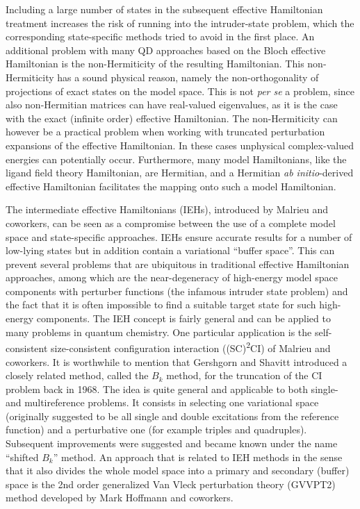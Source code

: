 Including a large number of states in the subsequent effective Hamiltonian treatment increases the risk of running into the intruder-state problem, which the corresponding state-specific methods tried to avoid in the first place. An additional problem with many QD approaches based on the Bloch effective Hamiltonian is the non-Hermiticity of the resulting Hamiltonian. This non-Hermiticity has a sound physical reason, namely the non-orthogonality of projections of exact states on the model space. This is not \textit{per se} a problem, since also non-Hermitian matrices can have real-valued eigenvalues, as it is the case with the exact (infinite order) effective Hamiltonian. The non-Hermiticity can however be a practical problem when working with truncated perturbation expansions of the effective Hamiltonian. In these cases unphysical complex-valued energies can potentially occur. Furthermore, many model Hamiltonians, like the ligand field theory Hamiltonian,\cite{Griff_1971_} are Hermitian, and a Hermitian \textit{ab initio}-derived effective Hamiltonian facilitates the mapping onto such a model Hamiltonian. 

The intermediate effective Hamiltonians (IEHs), introduced by Malrieu and coworkers,\cite{MalriDD_1985_809} can be seen as a compromise between the use of a complete model space and state-specific approaches. IEHs ensure accurate results for a number of low-lying states but in addition contain a variational ``buffer space''. This can prevent several problems that are ubiquitous in traditional effective Hamiltonian approaches, among which are the near-degeneracy of high-energy model space components with perturber functions (the infamous intruder state problem) and the fact that it is often impossible to find a suitable target state for such high-energy components.\cite{HeullM_2009_76} The IEH concept is fairly general and can be applied to many problems in quantum chemistry.\cite{HeullM_2009_76} One particular application is the self-consistent size-consistent configuration interaction ((SC)\textsuperscript{2}CI) of Malrieu and coworkers.\cite{DaudeHM_1993_1240} It is worthwhile to mention that Gershgorn and Shavitt introduced a closely related method, called the $B_k$ method, for the truncation of the CI problem back in 1968.\cite{GershS_1968_751} The idea is quite general and applicable to both single- and multireference problems. It consists in selecting one variational space (originally suggested to be all single and double excitations from the reference function) and a perturbative one (for example triples and quadruples). Subsequent improvements were suggested\cite{DavidMD_1981_5491, RawliD_1983_424, NitzsD_1978_3103, NitzsD_1978_7201} and became known under the name “shifted $B_k$” method. An approach that is related to IEH methods in the sense that it also divides the whole model space into a primary and secondary (buffer) space is the 2nd order generalized Van Vleck perturbation theory (GVVPT2) method developed by Mark Hoffmann and coworkers.\cite{KhaitSH_2002_4133, JiangKH_2009_4374}

